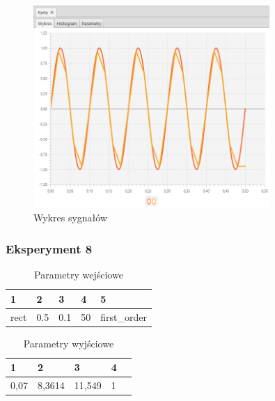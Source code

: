 \documentclass[12pt]{article}
\begin{document}
{{{                \begin{figure}[H]
                    \centering
                    \includegraphics[width=0.8\textwidth]{img/result/experiment2/07/data_draw_original_chart_recon_output_130439.png}
                    \caption{Wykres sygnałów}
                \end{figure}
            }
            \newpage

            \subsubsection{Eksperyment 8} {
                \begin{table}[H]
                    \centering
                    \begin{tabular}{|l|l|l|l|l|}
                        \hline
                        1 & 2 & 3 & 4 & 5   \\ \hline
                        rect & 0.5 & 0.1 & 50 & first\_order  \\ \hline
                    \end{tabular}
                    \caption{Parametry wejściowe}
                \end{table}

                \begin{table}[H]
                    \centering
                    \begin{tabular}{|l|l|l|l|l|}
                        \hline
                        1 & 2 & 3 & 4   \\ \hline
                        0,07 & 8,3614 & 11,549 & 1 \\ \hline
                    \end{tabular}
                    \caption{Parametry wyjściowe}
                \end{table}


}}}
\end{document}
